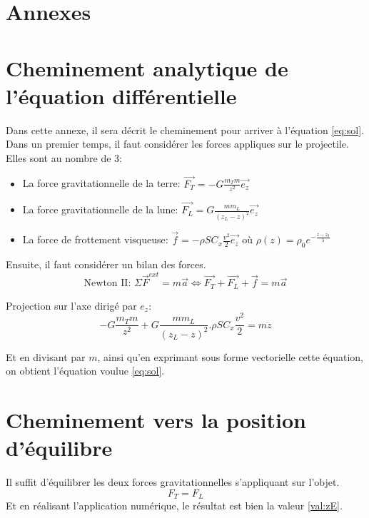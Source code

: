 \documentclass[a4paper,12pt,twoside]{article}
\begin{document}
\newpage

\appendix
\section*{Annexes}
\section{Cheminement analytique de l'équation différentielle}
Dans cette annexe, il sera décrit le cheminement pour arriver à l'équation \ref{eq:sol}.
Dans un premier temps, il faut considérer les forces appliques sur le projectile.
Elles sont au nombre de 3:
\begin{itemize}
	\item La force gravitationnelle\cite{ref:ansermet} de la terre: $\vec{F_T} = -G\frac{m_T m}{z^2}\vec{e_z}$
	\item La force gravitationnelle de la lune: $\vec{F_L} = G\frac{m m_L }{(z_L-z)^2}\vec{e_z}$
	\item La force de frottement visqueuse: $\vec{f} = - \rho S C_x \frac{v^2}{2}\vec{e_z}$ où $\rho (z) = \rho_0 e^{-\frac{z-z_0}{\lambda}}$
\end{itemize}

Ensuite, il faut considérer un bilan des forces.
\begin{equation}
	\text{Newton II: }\Sigma\vec{F}^{ext} = m\vec{a} \Leftrightarrow \vec{F_T} + \vec{F_L} + \vec{f} = m\vec{a}
\end{equation}

Projection sur l'axe dirigé par $e_z$:
\begin{equation}
	-G\frac{m_T m}{z^2} + G\frac{m m_L }{(z_L-z)^2} . \rho S C_x \frac{v^2}{2} = m\ddot{z}
\end{equation}

Et en divisant par $m$, ainsi qu'en exprimant sous forme vectorielle cette équation, on obtient l'équation voulue \ref{eq:sol}.

\section{Cheminement vers la position d'équilibre}
Il suffit d'équilibrer les deux forces gravitationnelles s'appliquant sur l'objet.
\begin{equation}
	F_T = F_L
\end{equation}
Et en réalisant l'application numérique, le résultat est bien la valeur \ref{val:zE}.
\end{document}
